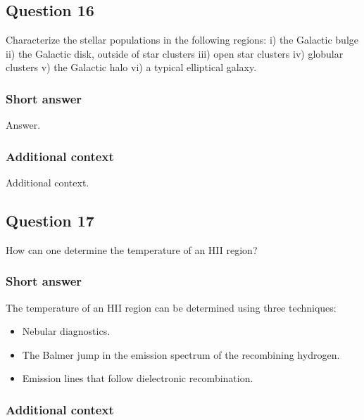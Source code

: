 \documentclass[a4paper,10pt]{article}
\begin{document}

\newpage
\subsection{Question 16}

Characterize the stellar populations in the following regions: i) the Galactic bulge ii) the Galactic disk, outside of star clusters iii) open star clusters iv) globular clusters v) the Galactic halo vi) a typical elliptical galaxy.

\subsubsection{Short answer}

Answer.

\subsubsection{Additional context}

Additional context.


\newpage
\subsection{Question 17}

How can one determine the temperature of an HII region?

\subsubsection{Short answer}

The temperature of an HII region can be determined using three techniques:

\begin{itemize}
    \item Nebular diagnostics.
    \item The Balmer jump in the emission spectrum of the recombining hydrogen.
    \item Emission lines that follow dielectronic recombination.
\end{itemize}

\subsubsection{Additional context}
\end{document}
